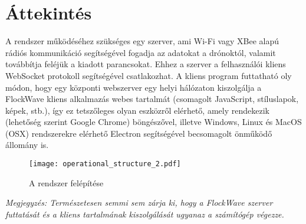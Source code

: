 \section{Áttekintés}

A rendszer működéséhez szükséges egy szerver, ami Wi-Fi vagy XBee alapú rádiós
kommunikáció segítségével fogadja az adatokat a drónoktól, valamit továbbítja
feléjük a kiadott parancsokat. Ehhez a szerver a felhasználói kliens WebSocket
protokoll segítségével csatlakozhat. A kliens program futtatható oly módon, hogy
egy központi webszerver egy helyi hálózaton kiszolgálja a FlockWave kliens
alkalmazás webes tartalmát (csomagolt JavaScript, stíluslapok, képek, stb.), így
ez tetszőleges olyan eszközről elérhető, amely rendekezik (lehetőség szerint
Google Chrome) böngészővel, illetve Windows, Linux és MacOS (OSX) rendszerekre
elérhető Electron segítségével becsomagolt önműködő állomány is.

\begin{figure}[H]
  \centering
    \texttt{[image: operational\_structure\_2.pdf]}
  \caption{A rendszer felépítése}
\end{figure}

\textit{Megjegyzés: Természetesen semmi sem zárja ki, hogy a FlockWave szerver
futtatását és a kliens tartalmának kiszolgálását ugyanaz a számítógép végezze.}
